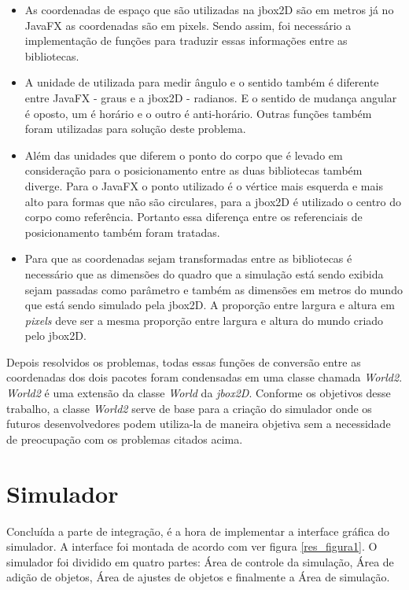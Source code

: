 \begin{itemize}
	\item As coordenadas de espaço que são utilizadas na jbox2D são em metros já no JavaFX as coordenadas são em pixels. Sendo assim, foi necessário a implementação de funções para traduzir essas informações entre as bibliotecas.
	\item A unidade de utilizada para medir ângulo e o sentido também é diferente entre JavaFX - graus e a jbox2D - radianos. E o sentido de mudança angular é oposto, um é horário e o outro é anti-horário. Outras funções também foram utilizadas para solução deste problema.
	\item Além das unidades que diferem o ponto do corpo que é levado em consideração para o posicionamento entre as duas bibliotecas também diverge. Para o JavaFX o ponto utilizado é o vértice mais esquerda e mais alto para formas que não são circulares, para a jbox2D é utilizado o centro do corpo como referência. Portanto essa diferença entre os referenciais de posicionamento também foram tratadas.
	\item Para que as coordenadas sejam transformadas entre as bibliotecas é necessário que as dimensões do quadro que a simulação está sendo exibida sejam passadas como parâmetro e também as dimensões em metros do mundo que está sendo simulado pela jbox2D. A proporção entre largura e altura em \textit{pixels} deve ser a mesma proporção entre largura e altura do mundo criado pelo jbox2D.
\end{itemize}

Depois resolvidos os problemas, todas essas funções de conversão entre as coordenadas dos dois pacotes foram condensadas em uma classe chamada \textit{World2}. \textit{World2} é uma extensão da classe \textit{World} da \textit{jbox2D}. Conforme os objetivos desse trabalho, a classe\textit{ World2} serve de base para a criação do simulador onde os futuros desenvolvedores podem utiliza-la de maneira objetiva sem a necessidade de preocupação com os problemas citados acima.

\section{Simulador}
Concluída a parte de integração, é a hora de implementar a interface gráfica do simulador. A interface foi montada de acordo com  ver figura \ref{res_figura1}.  O simulador foi dividido em quatro partes: Área de controle da simulação, Área de adição de objetos, Área de ajustes de objetos e finalmente a Área de simulação.

